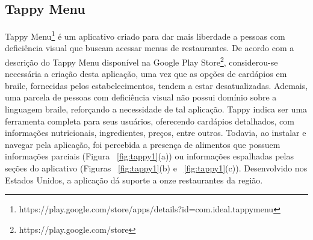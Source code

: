 \subsection{\label{subsec:tappy}Tappy Menu}
Tappy Menu\footnote{https://play.google.com/store/apps/details?id=com.ideal.tappymenu} é um aplicativo criado para dar mais liberdade a pessoas com deficiência visual que buscam acessar menus de restaurantes. De acordo com a descrição do Tappy Menu disponível na Google Play Store\footnote{https://play.google.com/store}, considerou-se necessária a criação desta aplicação, uma vez que as opções de cardápios em braile, fornecidas pelos estabelecimentos, tendem a estar desatualizadas. Ademais, uma parcela de pessoas com deficiência visual não possui domínio sobre a linguagem braile, reforçando a necessidade de tal aplicação. Tappy indica ser uma ferramenta completa para seus usuários, oferecendo cardápios detalhados, com informações nutricionais, ingredientes, preços, entre outros. Todavia, ao instalar e navegar pela aplicação, foi percebida a presença de alimentos que possuem informações parciais (Figura ~\ref{fig:tappy1}(a)) ou informações espalhadas pelas seções do aplicativo (Figuras ~\ref{fig:tappy1}(b) e ~\ref{fig:tappy1}(c)). Desenvolvido nos Estados Unidos, a aplicação dá suporte a onze restaurantes da região.

